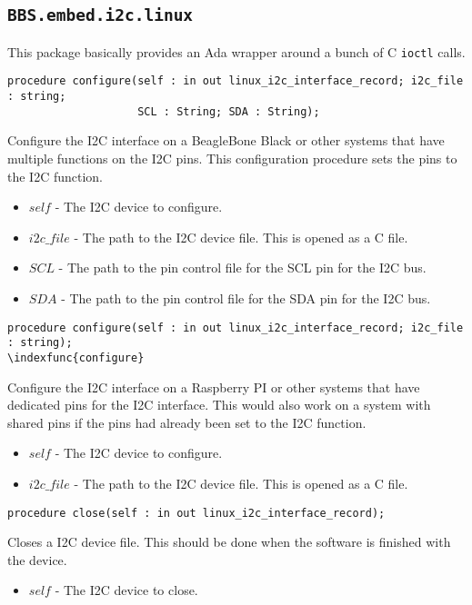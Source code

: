 \documentclass[10pt, openany]{book}
\newcommand{\indexfunc}[1]{\index[func]{#1}}
\newcommand{\package}[1]{\texttt{#1}}
\newcommand{\function}[1]{\texttt{#1}}
\begin{document}
\subsection{\package{BBS.embed.i2c.linux}}
This package basically provides an Ada wrapper around a bunch of C \function{ioctl} calls.
\begin{lstlisting}
procedure configure(self : in out linux_i2c_interface_record; i2c_file : string;
                    SCL : String; SDA : String);
\end{lstlisting}
\indexfunc{configure}
Configure the I2C interface on a BeagleBone Black or other systems that have multiple functions on the I2C pins.  This configuration procedure sets the pins to the I2C function.
\begin{itemize}
  \item $self$ - The I2C device to configure.
  \item $i2c\_file$ - The path to the I2C device file.  This is opened as a C file.
  \item $SCL$ - The path to the pin control file for the SCL pin for the I2C bus.
  \item $SDA$ - The path to the pin control file for the SDA pin for the I2C bus.
\end{itemize}

\begin{lstlisting}
procedure configure(self : in out linux_i2c_interface_record; i2c_file : string);
\indexfunc{configure}
\end{lstlisting}
Configure the I2C interface on a Raspberry PI or other systems that have dedicated pins for the I2C interface.  This would also work on a system with shared pins if the pins had already been set to the I2C function.
\begin{itemize}
  \item $self$ - The I2C device to configure.
  \item $i2c\_file$ - The path to the I2C device file.  This is opened as a C file.
\end{itemize}

\begin{lstlisting}
procedure close(self : in out linux_i2c_interface_record);
\end{lstlisting}
\indexfunc{close}
Closes a I2C device file.  This should be done when the software is finished with the device.
\begin{itemize}
  \item $self$ - The I2C device to close.
\end{itemize}
\end{document}
